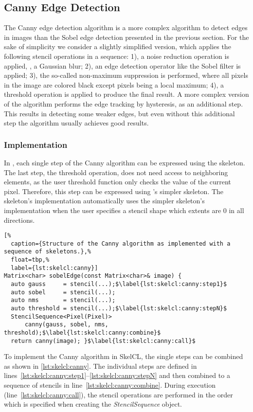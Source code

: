 \subsection{Canny Edge Detection}
The Canny edge detection algorithm is a more complex algorithm to detect edges in images than the Sobel edge detection presented in the previous section.
For the sake of simplicity we consider a slightly simplified version, which applies the following stencil operations in a sequence:
1), a noise reduction operation is applied, \eg, a Gaussian blur;
2), an edge detection operator like the Sobel filter is applied;
3), the so-called non-maximum suppression is performed, where all pixels in the image are colored black except pixels being a local maximum;
4), a threshold operation is applied to produce the final result.
A more complex version of the algorithm performs the edge tracking by hysteresis, as an additional step.
This results in detecting some weaker edges, but even without this additional step the algorithm usually achieves good results.


\subsubsection*{\SkelCL Implementation}
In \SkelCL, each single step of the Canny algorithm can be expressed using the \stencil skeleton.
The last step, the threshold operation, does not need access to neighboring elements, as the user threshold function only checks the value of the current pixel.
Therefore, this step can be expressed using \SkelCL's simpler \map skeleton.
The  skeleton's implementation automatically uses the simpler \map skeleton's implementation when the user specifies a stencil shape which extents are $0$ in all directions.

\begin{lstlisting}[%
  caption={Structure of the Canny algorithm as implemented with a sequence of skeletons.},%
  float=tbp,%
  label={lst:skelcl:canny}]
Matrix<char> sobelEdge(const Matrix<char>& image) {
  auto gauss     = stencil(...);$\label{lst:skelcl:canny:step1}$
  auto sobel     = stencil(...);
  auto nms       = stencil(...);
  auto threshold = stencil(...);$\label{lst:skelcl:canny:stepN}$
  StencilSequence<Pixel(Pixel)>
      canny(gauss, sobel, nms, threshold);$\label{lst:skelcl:canny:combine}$
  return canny(image); }$\label{lst:skelcl:canny:call}$
\end{lstlisting}

To implement the Canny algorithm in SkelCL, the single steps can be combined as shown in \autoref{lst:skelcl:canny}.
The individual steps are defined in lines~\ref{lst:skelcl:canny:step1}--\ref{lst:skelcl:canny:stepN} and then combined to a sequence of stencils in line~\ref{lst:skelcl:canny:combine}.
During execution (line~\ref{lst:skelcl:canny:call}), the stencil operations are performed in the order which is specified when creating the \emph{StencilSequence} object.

